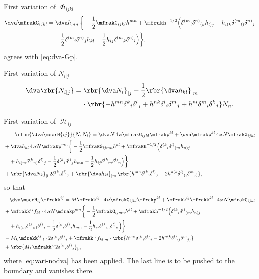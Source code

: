 \documentclass[a4paper,11pt]{article}
\begin{document}
First variation of $\mfrakG_{ijkl}$
\begin{align}
\dva \mfrakG_{ijkl} &= \dva h_{mn}\,\bigg\{-\frac{1}{2}\mfrakG_{ijkl} h^{mn}
+ \mfrakh^{-1/2} \Big(
\delta^{(m}{}_{i} \delta^{n)}{}_{(k} h_{l)j} +
h_{i(k} \delta^{(m}{}_{l)} \delta^{n)}{}_{j}
\nonumber \\
&\quad -
\frac{1}{2} \delta^{(m}{}_{i} \delta^{n)}{}_{j} h_{kl} - \frac{1}{2}
h_{ij} \delta^{(m}{}_{k} \delta^{n)}{}_{l} \Big)
\bigg\}.
\label{eq:dva-G}
\end{align}
 agrees with \cref{eq:dva-Gp}.

First variation of $N_{i|j}$
\begin{align}
\dva \rbr{N_{i|j}} &=
\rbr{\dva N_{i}}_{|j} -
\frac{1}{2} \rbr{\dva h_{kl}}_{|m}
\nonumber \\
&\quad\,\cdot \rbr{
- h^{mn} \delta^{k}{}_{i} \delta^{l}{}_{j}
+ h^{nk} \delta^{l}{}_{i} \delta^{m}{}_{j}
+ h^{nl} \delta^{m}{}_{i} \delta^{k}{}_{j}} N_n.
\end{align}

First variation of $\mscrH_{ij}$
\begin{align}
&\qquad
\rfun{\dva\mscrH{ij}}{N, N_i} = \dva 
N\,4\varkappa\mfrakG_{ijkl}\mfrakp^{kl}
+ \dva\mfrakp^{kl}\,4\varkappa N \mfrakG_{ijkl}
\nonumber \\
&+
\dva h_{kl}\,4\varkappa N \mfrakp^{mn}
\bigg\{-\frac{1}{2}\mfrakG_{ijmn}h^{kl} 
+ \mfrakh^{-1/2} \Big(
\delta^{(k}{}_{i} \delta^{l)}{}_{(m} h_{n)j} 
\nonumber \\
&\quad +
h_{i(m} \delta^{(k}{}_{n)} \delta^{l)}{}_{j} - \frac{1}{2}
\delta^{(k}{}_{i} \delta^{l)}{}_{j} h_{mn} - \frac{1}{2}
h_{ij} \delta^{(k}{}_{m} \delta^{l)}{}_{n} \Big)\bigg\}
\nonumber \\
& +
\rbr{\dva N_k}_{|l}\, 2 \delta^{(k}{}_{i}\delta^{l)}{}_{j} +
\rbr{\dva h_{kl}}_{|m}\, \rbr{
h^{mn} \delta^{(k}{}_{i} \delta^{l)}{}_{j} - 2
h^{n(k} \delta^{l)}{}_{(i} \delta^{m}{}_{j)}},
\end{align}
so that
\begin{align}
&\quad\dva \mscrH_{ij} \mfrakk^{ij} =
M \mfrakk^{ij}\cdot 4\varkappa \mfrakG_{ijkl} \mfrakp^{kl} +
\mfrakk^{ij} \mfrakk^{kl}\cdot 4\varkappa N \mfrakG_{ijkl}
\nonumber \\
& +
\mfrakk^{ij} f_{kl}\cdot 4\varkappa N \mfrakp^{mn}
\bigg\{-\frac{1}{2}\mfrakG_{ijmn}h^{kl} 
+ \mfrakh^{-1/2} \Big(
\delta^{(k}{}_{i} \delta^{l)}{}_{(m} h_{n)j}
\nonumber \\
&\quad +
h_{i(m} \delta^{(k}{}_{n)} \delta^{l)}{}_{j} - \frac{1}{2}
\delta^{(k}{}_{i} \delta^{l)}{}_{j} h_{mn} - \frac{1}{2}
h_{ij} \delta^{(k}{}_{m} \delta^{l)}{}_{n} \Big)\bigg\}
\nonumber \\
& -
M_k \mfrakk^{ij}{}_{|l}\cdot 2\delta^{(k}{}_{i}\delta^{l)}{}_{j}
+ \mfrakk^{ij} f_{kl|m}\cdot\rbr{
h^{mn} \delta^{(k}{}_{i} \delta^{l)}{}_{j} - 2
h^{n(k} \delta^{l)}{}_{(i} \delta^{m}{}_{j)}}
\nonumber \\
& +
\rbr{M_k \mfrakk^{ij}2\delta^{(k}{}_{i}\delta^{l)}{}_{j}}_{|l},
\end{align}
where \cref{eq:vari-nodva} has been applied. The last line is to be pushed to 
the boundary and vanishes there.
\end{document}
